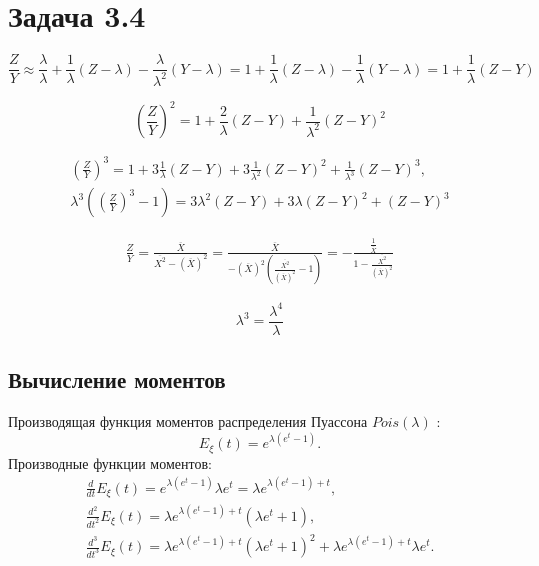 \section*{Задача 3.4}

\begin{equation}
    \frac{Z}{Y}
    \approx \frac{\lambda}{\lambda} + \frac{1}{\lambda} ( Z - \lambda ) - \frac{\lambda}{\lambda^2} ( Y - \lambda )
    = 1 + \frac{1}{\lambda} ( Z - \lambda ) - \frac{1}{\lambda} ( Y - \lambda )
    = 1 + \frac{1}{\lambda} ( Z - Y )
\end{equation}

\begin{equation}
    \left ( \frac{Z}{Y} \right )^2 = 1 + \frac{2}{\lambda} \left ( Z - Y \right ) + \frac{1}{\lambda^2} \left ( Z - Y \right )^2
\end{equation}

\begin{gather}
    \left ( \frac{Z}{Y} \right )^3 = 1 + 3 \frac{1}{\lambda} \left ( Z - Y \right ) + 3 \frac{1}{\lambda^2} \left ( Z - Y \right )^2 + \frac{1}{\lambda^3} \left ( Z - Y \right )^3 , \\
    \lambda^3 \left ( \left ( \frac{Z}{Y} \right )^3 - 1 \right ) =  3 \lambda^2 \left ( Z - Y \right ) + 3 \lambda \left ( Z - Y \right )^2 + \left ( Z - Y \right )^3
\end{gather}

\begin{multline}
    \frac{Z}{Y}
    = \frac{\overline{X}}{\overline{X^2} - \left ( \overline{X} \right )^2}
    = \frac{\overline{X}}{- \left ( \overline{X} \right )^2 \left ( \frac{\overline{X^2}}{\left ( \overline{X} \right )^2} - 1 \right )}
    = - \frac{\frac{1}{\overline{X}}}{1 - \frac{\overline{X^2}}{\left ( \overline{X} \right )^2}}
\end{multline}

\begin{equation}
    \lambda^3 = \frac{\lambda^4}{\lambda}
\end{equation}

\subsection{Вычисление моментов}

Производящая функция моментов распределения Пуассона $Pois(\lambda)$ :
\begin{equation}
    E_{\xi}(t) = e^{\lambda ( e^t - 1 )} .
\end{equation}
Производные функции моментов:
\begin{gather}
    \frac{d}{dt} E_{\xi}(t) = e^{\lambda ( e^t - 1 )} \lambda e^t = \lambda e^{\lambda ( e^t - 1 ) + t}, \\
    \frac{d^2}{dt^2} E_{\xi}(t) = \lambda e^{\lambda ( e^t - 1 ) + t} \left ( \lambda e^t + 1 \right ) , \\
    \frac{d^3}{dt^3} E_{\xi}(t) = \lambda e^{\lambda ( e^t - 1 ) + t} \left ( \lambda e^t + 1 \right )^2 + \lambda e^{\lambda ( e^t - 1 ) + t} \lambda e^t .
\end{gather}

